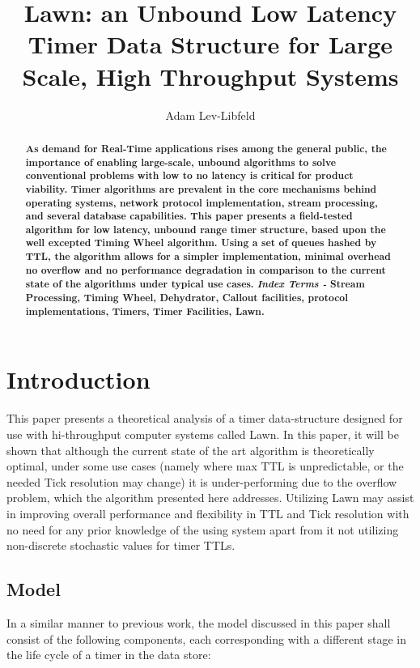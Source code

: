 \documentclass[acmsmall]{acmart} %
\title{Lawn: an Unbound Low Latency Timer Data Structure for Large Scale, High Throughput Systems}
\author{Adam Lev-Libfeld}
\affiliation{
	\institution{Tamar Labs}
	\city{Tel-Aviv}
	\state{Israel}
}
\begin{document}
\maketitle

\begin{abstract}
\textbf{\noindent As demand for Real-Time applications rises among the general public, the importance of enabling large-scale, unbound algorithms to solve conventional problems with low to no latency is critical for product viability\cite{WHT}. Timer algorithms are prevalent in the core mechanisms behind  operating systems\cite{BSD}, network protocol implementation, stream processing, and several database capabilities. This paper presents a field-tested algorithm for low latency, unbound range timer structure, based upon the well excepted Timing Wheel algorithm. Using a set of queues hashed by TTL, the algorithm allows for a simpler implementation, minimal overhead no overflow and no performance degradation in comparison to the current state of the algorithms under typical use cases.}
\linebreak \linebreak
\textbf{\textit{Index Terms -} Stream Processing, Timing Wheel, Dehydrator, Callout facilities, protocol implementations, Timers, Timer Facilities, Lawn.}
\end{abstract}


\section{Introduction}
This paper presents a theoretical analysis of a timer data-structure designed for use with hi-throughput computer systems called Lawn. In this paper, it will be shown that although the current state of the art algorithm is theoretically optimal, under some use cases (namely where max TTL is unpredictable, or the needed Tick resolution may change) it is under-performing due to the overflow problem, which the algorithm presented here addresses. Utilizing Lawn may assist in improving overall performance and flexibility in TTL and Tick resolution with no need for any prior knowledge of the using system apart from it not utilizing non-discrete stochastic values for timer TTLs.
\subsection{Model}
In a similar manner to previous work\cite{TW}\cite{CQ}\cite{EMP}, the model discussed in this paper shall consist of the following components, each corresponding with a different stage in the life cycle of a timer in the data store:
\end{document}

